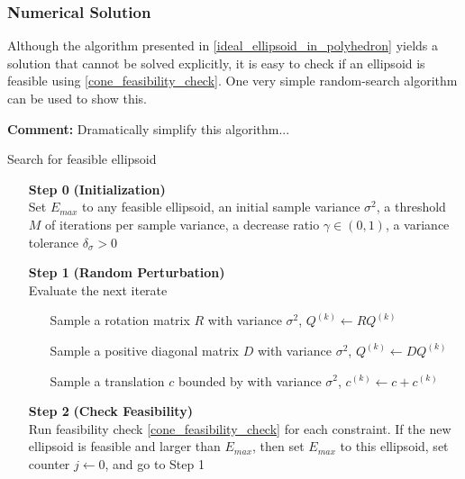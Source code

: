 \documentclass{article}
\newenvironment{comment}
  {\par\medskip
   \color{red}%
   \begin{framed}
   \textbf{Comment: }\ignorespaces}
 {\end{framed}
  \medskip}
\theoremstyle{case}
\numberwithin{theorem}{subsection}
\newcommand{\ck}{{c^{(k)}}}
\newcommand{\qk}{{Q^{(k)}}}
\begin{document}
\subsubsection{Numerical Solution}

Although the algorithm presented in \cref{ideal_ellipsoid_in_polyhedron} yields a solution that cannot be solved explicitly, it is easy to check if an ellipsoid is feasible using \cref{cone_feasibility_check}.
One very simple random-search algorithm can be used to show this.

\begin{comment}
Dramatically simplify this algorithm...
\end{comment}

\begin{algorithm}[H]
    \caption{Search for feasible ellipsoid}
    \label{numerical_ellipsoid_algorithm}
    \begin{itemize}
        \item[\textbf{Step 0}] \textbf{(Initialization)} \\
                Set $E_{max}$ to any feasible ellipsoid, 
                an initial sample variance $\sigma^2$, 
                a threshold $M$ of iterations per sample variance, 
                a decrease ratio $\gamma \in (0, 1)$, 
                a variance tolerance $\delta_{\sigma} > 0$
        
        \item[\textbf{Step 1}] \textbf{(Random Perturbation)} \\
            Evaluate the next iterate \begin{itemize}
                \item[] Sample a rotation matrix $R$ with variance $\sigma^2$, $\qk \gets R \qk$
                \item[] Sample a positive diagonal matrix $D$ with variance $\sigma^2$, $\qk \gets D \qk$
                \item[] Sample a translation $c$ bounded by with variance $\sigma^2$, $\ck \gets c + \ck$
            \end{itemize}
        
        \item[\textbf{Step 2}] \textbf{(Check Feasibility)} \\
            Run feasibility check \cref{cone_feasibility_check} for each constraint.
            If the new ellipsoid is feasible and larger than $E_{max}$, then 
            	set $E_{max}$ to this ellipsoid,
            	set counter $j \gets 0$, and
            	go to Step 1
        

\end{itemize}
\end{algorithm}
\end{document}
